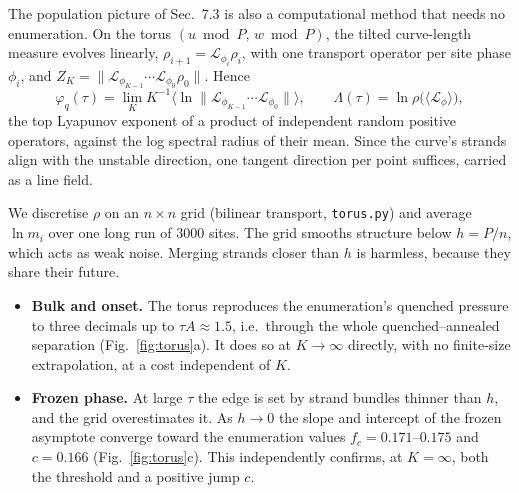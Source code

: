 \documentclass[10pt,a4paper]{article}
\begin{document}
The population picture of Sec.~7.3 is also a computational method that needs no enumeration.
On the torus $(u\bmod P,\,w\bmod P)$, the tilted curve-length measure evolves linearly, $\rho_{i+1}=\mathcal L_{\phi_i}\rho_i$, with one transport operator per site phase $\phi_i$, and $Z_K=\|\mathcal L_{\phi_{K-1}}\cdots\mathcal L_{\phi_0}\rho_0\|$. Hence
\begin{equation}
\varphi_q(\tau)=\lim_K K^{-1}\big\langle\ln\|\mathcal L_{\phi_{K-1}}\cdots\mathcal L_{\phi_0}\|\big\rangle,\qquad
\Lambda(\tau)=\ln\rho\big(\langle\mathcal L_\phi\rangle\big),
\label{eq:torus}
\end{equation}
the top Lyapunov exponent of a product of independent random positive operators, against the log spectral radius of their mean.
Since the curve's strands align with the unstable direction, one tangent direction per point suffices, carried as a line field.

We discretise $\rho$ on an $n\times n$ grid (bilinear transport, \texttt{torus.py}) and average $\ln m_i$ over one long run of $3000$ sites.
The grid smooths structure below $h=P/n$, which acts as weak noise. Merging strands closer than $h$ is harmless, because they share their future.
\begin{itemize}
\item \textbf{Bulk and onset.} The torus reproduces the enumeration's quenched pressure to three decimals up to $\tau A\approx1.5$, i.e.\ through the whole quenched--annealed separation (Fig.~\ref{fig:torus}a). It does so at $K\to\infty$ directly, with no finite-size extrapolation, at a cost independent of $K$.
\item \textbf{Frozen phase.} At large $\tau$ the edge is set by strand bundles thinner than $h$, and the grid overestimates it. As $h\to0$ the slope and intercept of the frozen asymptote converge toward the enumeration values $f_c=0.171$--$0.175$ and $c=0.166$ (Fig.~\ref{fig:torus}c). This independently confirms, at $K=\infty$, both the threshold and a positive jump $c$.
\end{itemize}
\end{document}
